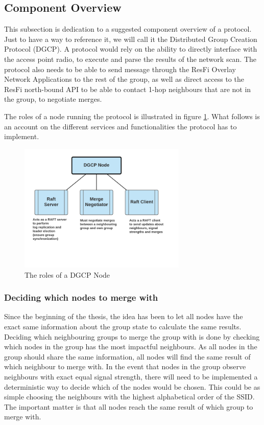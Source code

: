 \subsection{Component Overview }
This subsection is dedication to a suggested component overview of a protocol. Just to have a way to reference it, we will call it the Distributed Group Creation Protocol (DGCP). 
A protocol would rely on the ability to directly interface with the access point radio, to execute and parse the results of the network scan. The protocol also
needs to be able to send message through the ResFi Overlay Network Applications to the rest of the group, as well as direct access to the ResFi north-bound API to be able to contact 1-hop
neighbours that are not in the group, to negotiate merges. 

The roles of a node running the protocol is illustrated in figure \ref{fig:dgcproles}. What follows is an account on the different services and functionalities the protocol
has to implement.  

\begin{figure}
	\centering
	\includegraphics[width=8cm]{Images/dgcpnode.png}
		\caption{The roles of a DGCP Node }%
		\label{fig:dgcproles}%
\end{figure}

\subsubsection{Deciding which nodes to merge with}
Since the beginning of the thesis, the idea has been to let all nodes have the exact same information about the group state to calculate the same results. Deciding
which neighbouring groups to merge the group with is done by checking which nodes in the group has the most impactful neighbours. As all nodes in the group should share
the same information, all nodes will find the same result of which neighbour to merge with.
In the event that nodes in the group observe neighbours with exact equal signal strength, there will need to be implemented a deterministic way to decide which of the nodes would be chosen.
This could be as simple choosing the neighbours with the highest alphabetical order of the SSID. The important matter is that all nodes reach the same result of which group to merge with. 


